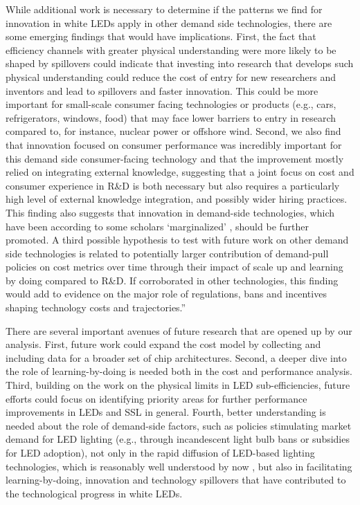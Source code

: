 \documentclass[parskip=full]{article}
\begin{document}
While additional work is necessary to determine if the patterns we find for innovation in white LEDs apply in other demand side technologies, there are some emerging findings that would have implications. First, the fact that efficiency channels with greater physical understanding were more likely to be shaped by spillovers could indicate that investing into research that develops such physical understanding could reduce the cost of entry for new researchers and inventors and lead to spillovers and faster innovation. This could be more important for small-scale consumer facing technologies or products (e.g., cars, refrigerators, windows, food) that may face lower barriers to entry in research compared to, for instance, nuclear power or offshore wind. Second, we also find that innovation focused on consumer performance was incredibly important for this demand side consumer-facing technology and that the improvement mostly relied on integrating external knowledge, suggesting that a joint focus on cost and consumer experience in R\&D is both necessary but also requires a particularly high level of external knowledge integration, and possibly wider hiring practices. This finding also suggests that innovation in demand-side technologies, which have been according to some scholars ‘marginalized’ \cite{Wilson2012}, should be further promoted. A third possible hypothesis to test with future work on other demand side technologies is related to potentially larger contribution of demand-pull policies on cost metrics over time through their impact of scale up and learning by doing compared to R\&D. If corroborated in other technologies, this finding would add to evidence on the major role of regulations, bans and incentives shaping technology costs and trajectories.”

There are several important avenues of future research that are opened up by our analysis. First, future work could expand the cost model by collecting and including data for a broader set of chip architectures. Second, a deeper dive into the role of learning-by-doing is needed both in the cost and performance analysis. Third, building on the work on the physical limits in LED sub-efficiencies, future efforts could focus on identifying priority areas for further performance improvements in LEDs and SSL in general. Fourth, better understanding is needed about the role of demand-side factors, such as policies stimulating market demand for LED lighting (e.g., through incandescent light bulb bans or subsidies for LED adoption), not only in the rapid diffusion of LED-based lighting technologies, which is reasonably well understood by now \cite{Mills2014, Kamat2020, weinold2021quantifying, stegmaier2021incandescent, grubb2021new}, but also in facilitating learning-by-doing, innovation and technology spillovers that have contributed to the technological progress in white LEDs.
\end{document}
